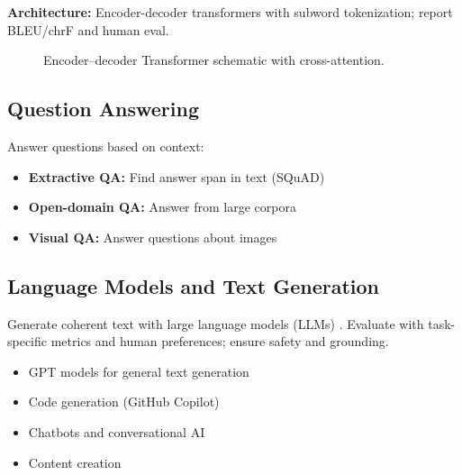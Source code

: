 \textbf{Architecture:} Encoder-decoder transformers with subword tokenization; report BLEU/chrF and human eval.

\begin{figure}[h]
  \centering
  \caption{Encoder–decoder Transformer schematic with cross-attention.}
  \label{fig:mt-transformer}
\end{figure}

\subsection{Question Answering}

Answer questions based on context:
\begin{itemize}
    \item \textbf{Extractive QA:} Find answer span in text (SQuAD)
    \item \textbf{Open-domain QA:} Answer from large corpora
    \item \textbf{Visual QA:} Answer questions about images
\end{itemize}

\subsection{Language Models and Text Generation}

Generate coherent text with large language models (LLMs) \textcite{Radford2019,Prince2023}. Evaluate with task-specific metrics and human preferences; ensure safety and grounding.
\begin{itemize}
    \item GPT models for general text generation
    \item Code generation (GitHub Copilot)
    \item Chatbots and conversational AI
    \item Content creation
\end{itemize}

